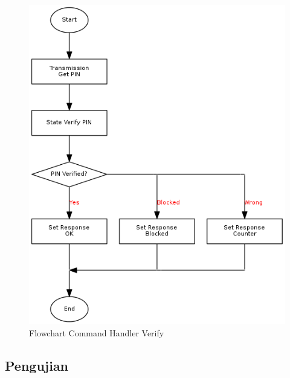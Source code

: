 \begin{figure}[h]
\centering
\includegraphics[height=0.4\textheight]{image/command/flow_cmdverify.png}
\caption{Flowchart Command Handler Verify}
\label{fig-flow-cmdverify}
\end{figure}

\subsection {Pengujian}

